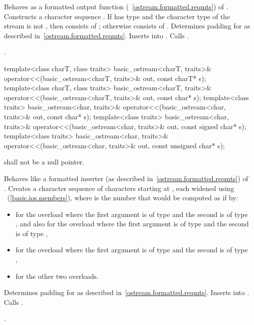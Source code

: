 \begin{itemdescr}
\pnum
\effects
Behaves as a formatted output function
(~\ref{ostream.formatted.reqmts}) of . 
Constructs a character sequence . 
If  has type
and the character type of the stream is not
,
then  consists of
;
otherwise  consists of
. Determines padding for  as described
in~\ref{ostream.formatted.reqmts}. Inserts  into
. Calls .

\pnum
\returns
{}.
\end{itemdescr}

%
\begin{itemdecl}
template<class charT, class traits>
  basic_ostream<charT, traits>& operator<<(basic_ostream<charT, traits>& out,
                                           const charT* s);
template<class charT, class traits>
  basic_ostream<charT, traits>& operator<<(basic_ostream<charT, traits>& out,
                                           const char* s);
template<class traits>
  basic_ostream<char, traits>& operator<<(basic_ostream<char, traits>& out,
                                          const char* s);
template<class traits>
  basic_ostream<char, traits>& operator<<(basic_ostream<char, traits>& out,
                                          const signed char* s);
template<class traits>
  basic_ostream<char, traits>& operator<<(basic_ostream<char, traits>& out,
                                          const unsigned char* s);
\end{itemdecl}

\begin{itemdescr}
\pnum
\requires
{} shall not be a null pointer.

\pnum
\effects
Behaves like a formatted inserter (as described in~\ref{ostream.formatted.reqmts}) of .
Creates a character sequence  of  characters
starting at , each widened using
~(\ref{basic.ios.members}),
where  is the number that would be computed as if by:
\begin{itemize}
\item
{}
for the overload where the first argument is of type
and the second is of type
,
and also for the overload where the first argument is of type
and the second is of type
,
\item
{}
for the overload where the first argument is of type
and the second is of type
,
\item
{}
for the other two overloads.
\end{itemize}
Determines padding for  as described
in~\ref{ostream.formatted.reqmts}. Inserts  into
. Calls .

\pnum
\returns
{}.
\end{itemdescr}


